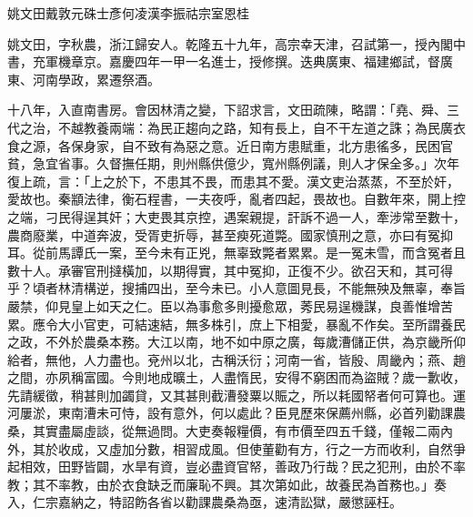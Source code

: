 
\begin{pinyinscope}
姚文田戴敦元硃士彥何凌漢李振祜宗室恩桂

姚文田，字秋農，浙江歸安人。乾隆五十九年，高宗幸天津，召試第一，授內閣中書，充軍機章京。嘉慶四年一甲一名進士，授修撰。迭典廣東、福建鄉試，督廣東、河南學政，累遷祭酒。

十八年，入直南書房。會因林清之變，下詔求言，文田疏陳，略謂：「堯、舜、三代之治，不越教養兩端：為民正趨向之路，知有長上，自不干左道之誅；為民廣衣食之源，各保身家，自不致有為惡之意。近日南方患賦重，北方患徭多，民困官貧，急宜省事。久督撫任期，則州縣供億少，寬州縣例議，則人才保全多。」次年復上疏，言：「上之於下，不患其不畏，而患其不愛。漢文吏治蒸蒸，不至於奸，愛故也。秦顓法律，衡石程書，一夫夜呼，亂者四起，畏故也。自數年來，開上控之端，刁民得逞其奸；大吏畏其京控，遇案親提，訐訴不過一人，牽涉常至數十，農商廢業，中道奔波，受胥吏折辱，甚至瘐死道斃。國家慎刑之意，亦曰有冤抑耳。從前馬譚氏一案，至今未有正兇，無辜致斃者累累。是一冤未雪，而含冤者且數十人。承審官刑撻橫加，以期得實，其中冤抑，正復不少。欲召天和，其可得乎？頃者林清構逆，搜捕四出，至今未已。小人意圖見長，不能無殃及無辜，奉旨嚴禁，仰見皇上如天之仁。臣以為事愈多則擾愈眾，莠民易逞機謀，良善惟增苦累。應令大小官吏，可結速結，無多株引，庶上下相愛，暴亂不作矣。至所謂養民之政，不外於農桑本務。大江以南，地不如中原之廣，每歲漕儲正供，為京畿所仰給者，無他，人力盡也。兗州以北，古稱沃衍；河南一省，皆殷、周畿內；燕、趙之間，亦夙稱富國。今則地成曠土，人盡惰民，安得不窮困而為盜賊？歲一歉收，先請緩徵，稍甚則加蠲貸，又其甚則截漕發粟以賑之，所以耗國帑者何可算也。運河屢淤，東南漕未可恃，設有意外，何以處此？臣見歷來保薦州縣，必首列勸課農桑，其實盡屬虛談，從無過問。大吏奏報糧價，有市價至四五千錢，僅報二兩內外，其於收成，又虛加分數，相習成風。但使董勸有方，行之一方而收利，自然爭起相效，田野皆闢，水旱有資，豈必盡資官帑，善政乃行哉？民之犯刑，由於不率教；其不率教，由於衣食缺乏而廉恥不興。其次第如此，故養民為首務也。」奏入，仁宗嘉納之，特詔飭各省以勸課農桑為亟，速清訟獄，嚴懲誣枉。


\end{pinyinscope}
